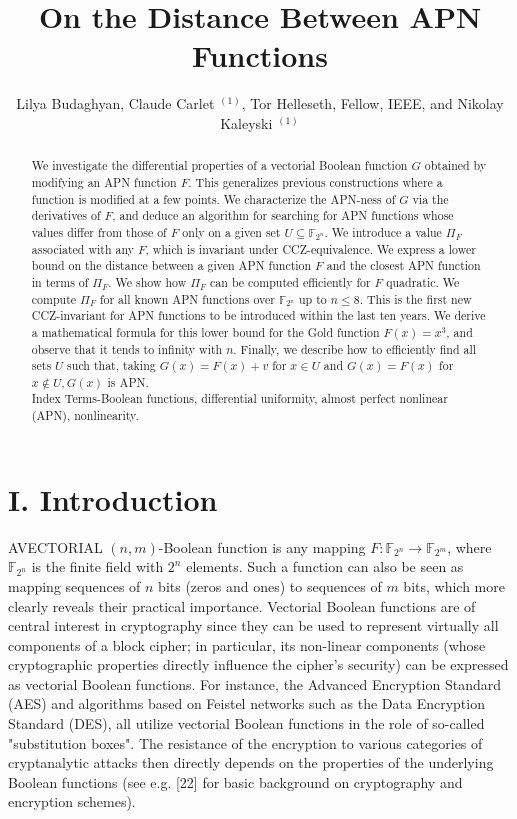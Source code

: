 \documentclass[10pt]{article}
\title{On the Distance Between APN Functions }
\author{Lilya Budaghyan, Claude Carlet ${ }^{(1)}$, Tor Helleseth, Fellow, IEEE, and Nikolay Kaleyski ${ }^{(1)}$}
\date{}
\begin{document}
\maketitle
\captionsetup{singlelinecheck=false}


\begin{abstract}
We investigate the differential properties of a vectorial Boolean function $G$ obtained by modifying an APN function $F$. This generalizes previous constructions where a function is modified at a few points. We characterize the APN-ness of $G$ via the derivatives of $F$, and deduce an algorithm for searching for APN functions whose values differ from those of $F$ only on a given set $U \subseteq \mathbb{F}_{2^{n}}$. We introduce a value $\Pi_{F}$ associated with any $F$, which is invariant under CCZ-equivalence. We express a lower bound on the distance between a given APN function $F$ and the closest APN function in terms of $\Pi_{F}$. We show how $\Pi_{F}$ can be computed efficiently for $F$ quadratic. We compute $\Pi_{F}$ for all known APN functions over $\mathbb{F}_{2^{n}}$ up to $n \leq 8$. This is the first new CCZ-invariant for APN functions to be introduced within the last ten years. We derive a mathematical formula for this lower bound for the Gold function $F(x)=x^{3}$, and observe that it tends to infinity with $n$. Finally, we describe how to efficiently find all sets $U$ such that, taking $G(x)=F(x)+v$ for $x \in U$ and $G(x)=F(x)$ for $x \notin U, G(x)$ is APN.\\
Index Terms-Boolean functions, differential uniformity, almost perfect nonlinear (APN), nonlinearity.
\end{abstract}

\section*{I. Introduction}
AVECTORIAL $(n, m)$-Boolean function is any mapping $F: \mathbb{F}_{2^{n}} \rightarrow \mathbb{F}_{2^{m}}$, where $\mathbb{F}_{2^{n}}$ is the finite field with $2^{n}$ elements. Such a function can also be seen as mapping sequences of $n$ bits (zeros and ones) to sequences of $m$ bits, which more clearly reveals their practical importance. Vectorial Boolean functions are of central interest in cryptography since they can be used to represent virtually all components of a block cipher; in particular, its non-linear components (whose cryptographic properties directly influence the cipher's security) can be expressed as vectorial Boolean functions. For instance, the Advanced Encryption Standard (AES) and algorithms based on Feistel networks such as the Data Encryption Standard (DES), all utilize vectorial Boolean functions in the role of so-called "substitution boxes". The resistance of the encryption to various categories of cryptanalytic attacks then directly depends on the properties of the underlying Boolean functions (see e.g. [22] for basic background on cryptography and encryption schemes).
\end{document}
